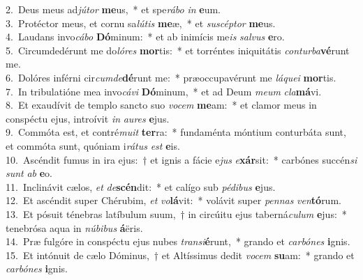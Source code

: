 {2.~}Deus meus ad\textit{jú}\textit{tor} \textbf{me}us,~* et spe\textit{rá}\textit{bo} \textit{in} \textbf{e}um.\\
{3.~}Protéctor meus, et cornu sa\textit{lú}\textit{tis} \textbf{me}æ,~* et \textit{su}\textit{scép}\textit{tor} \textbf{me}us.\\
{4.~}Laudans invo\textit{cá}\textit{bo} \textbf{Dó}minum:~* et ab inimícis me\textit{is} \textit{sal}\textit{vus} \textbf{e}ro.\\
{5.~}Circumdedérunt me do\textit{ló}\textit{res} \textbf{mor}tis:~* et torréntes iniquitátis \textit{con}\textit{tur}\textit{ba}\textbf{vé}runt me.\\
{6.~}Dolóres inférni cir\textit{cum}\textit{de}\textbf{dé}runt me:~* præoccupavérunt me \textit{lá}\textit{que}\textit{i} \textbf{mor}tis.\\
{7.~}In tribulatióne mea invo\textit{cá}\textit{vi} \textbf{Dó}minum,~* et ad Deum \textit{me}\textit{um} \textit{cla}\textbf{má}vi.\\
{8.~}Et exaudívit de templo sancto suo \textit{vo}\textit{cem} \textbf{me}am:~* et clamor meus in conspéctu ejus, introívit \textit{in} \textit{au}\textit{res} \textbf{e}jus.\\
{9.~}Commóta est, et contré\textit{mu}\textit{it} \textbf{ter}ra:~* fundaménta móntium conturbáta sunt, et commóta sunt, quóniam i\textit{rá}\textit{tus} \textit{est} \textbf{e}is.\\
{10.~}Ascéndit fumus in ira ejus:~† et ignis a fácie e\textit{jus} \textit{e}\textbf{xár}sit:~* carbónes succén\textit{si} \textit{sunt} \textit{ab} \textbf{e}o.\\
{11.~}Inclinávit cælos, \textit{et} \textit{de}\textbf{scén}dit:~* et calígo sub \textit{pé}\textit{di}\textit{bus} \textbf{e}jus.\\
{12.~}Et ascéndit super Chérubim, \textit{et} \textit{vo}\textbf{lá}vit:~* volávit super \textit{pen}\textit{nas} \textit{ven}\textbf{tó}rum.\\
{13.~}Et pósuit ténebras latíbulum suum,~† in circúitu ejus taberná\textit{cu}\textit{lum} \textbf{e}jus:~* tenebrósa aqua in \textit{nú}\textit{bi}\textit{bus} \textbf{á}ëris.\\
{14.~}Præ fulgóre in conspéctu ejus nubes \textit{tran}\textit{si}\textbf{é}runt,~* grando et \textit{car}\textit{bó}\textit{nes} \textbf{i}gnis.\\
{15.~}Et intónuit de cælo Dóminus,~† et Altíssimus dedit \textit{vo}\textit{cem} \textbf{su}am:~* grando et \textit{car}\textit{bó}\textit{nes} \textbf{i}gnis.\\
